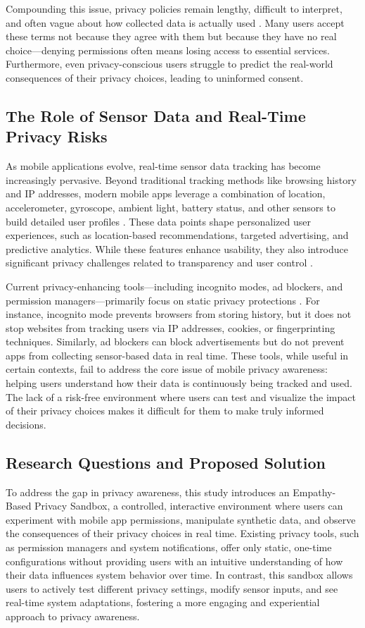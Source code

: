 \documentclass[acmlarge, nonacm]{acmart}
\begin{document}
Compounding this issue, privacy policies remain lengthy, difficult to interpret, and often vague about how collected data is actually used \cite{ObarandOeldorf-Hirsch2020}. Many users accept these terms not because they agree with them but because they have no real choice—denying permissions often means losing access to essential services. Furthermore, even privacy-conscious users struggle to predict the real-world consequences of their privacy choices, leading to uninformed consent.

\subsection{The Role of Sensor Data and Real-Time Privacy Risks}

As mobile applications evolve, real-time sensor data tracking has become increasingly pervasive. Beyond traditional tracking methods like browsing history and IP addresses, modern mobile apps leverage a combination of location, accelerometer, gyroscope, ambient light, battery status, and other sensors to build detailed user profiles \cite{CAHAR}. These data points shape personalized user experiences, such as location-based recommendations, targeted advertising, and predictive analytics. While these features enhance usability, they also introduce significant privacy challenges related to transparency and user control \cite{rathi2025predictive}.

Current privacy-enhancing tools—including incognito modes, ad blockers, and permission managers—primarily focus on static privacy protections \cite{incognito}. For instance, incognito mode prevents browsers from storing history, but it does not stop websites from tracking users via IP addresses, cookies, or fingerprinting techniques. Similarly, ad blockers can block advertisements but do not prevent apps from collecting sensor-based data in real time. These tools, while useful in certain contexts, fail to address the core issue of mobile privacy awareness: helping users understand how their data is continuously being tracked and used. The lack of a risk-free environment where users can test and visualize the impact of their privacy choices makes it difficult for them to make truly informed decisions.

\subsection{Research Questions and Proposed Solution}

To address the gap in privacy awareness, this study introduces an Empathy-Based Privacy Sandbox, a controlled, interactive environment where users can experiment with mobile app permissions, manipulate synthetic data, and observe the consequences of their privacy choices in real time. Existing privacy tools, such as permission managers and system notifications, offer only static, one-time configurations without providing users with an intuitive understanding of how their data influences system behavior over time. In contrast, this sandbox allows users to actively test different privacy settings, modify sensor inputs, and see real-time system adaptations, fostering a more engaging and experiential approach to privacy awareness.
\end{document}
